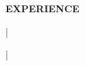 %
%
%
%
%



\vspace{\spaceBeforeSection}
\textbf{EXPERIENCE} \hrulefill
\vspace{\spaceAfterSection}

\textbf{\expBCompany} | \expBPosition \hfill \expBDateShort
    \begin{itemize}
        \expBDetails
    \end{itemize}

\medskip

\textbf{\expACompany} | \expAPosition \hfill \expADate
    \begin{itemize}
        \expADetails
    \end{itemize}
